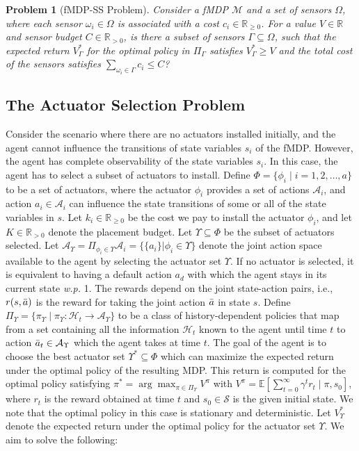 \documentclass[twocolumn]{autart}    %
\newtheorem{problem}{Problem}
\begin{document}
\begin{problem}[fMDP-SS Problem]
\label{prob:momdpss}
Consider a fMDP $\mathcal{M}$ and a set of sensors $\Omega$, where each sensor $\omega_i \in \Omega$ is associated with a cost $c_i \in \mathbb{R}_{\geq 0}$. For a value $V \in \mathbb{R}$ and sensor budget $C \in \mathbb{R}_{> 0}$, is there a subset of sensors $\Gamma \subseteq \Omega$, such that the expected return $V_\Gamma^*$ for the optimal policy in $ \Pi_\Gamma$ satisfies  $V_\Gamma^* \geq V$ and the total cost of the sensors satisfies $\sum_{\omega_i \in \Gamma} c_i \leq C$?
\end{problem}

\subsection{The Actuator Selection Problem}
Consider the scenario where there are no actuators installed initially, and the agent cannot influence the transitions of state variables $s_i$ of the fMDP. However, the agent has complete observability of the state variables $s_i$. In this case, the agent has to select a subset of actuators to install. 
Define $\Phi = \{\phi_i \mid i = 1,2,\hdots,a\}$ to be a set of actuators, where the actuator $\phi_i$ provides a set of actions $\mathcal{A}_i$, and action $a_i \in \mathcal{A}_i$ can influence the state transitions of some or all of the state variables in $s$. Let $k_i \in \mathbb{R}_{\geq 0}$ be the cost we pay to install the actuator $\phi_i$, and let $K \in \mathbb{R}_{> 0}$ denote the placement budget. Let $\Upsilon \subseteq \Phi$ be the subset of actuators selected. Let $\mathcal{A}_{\Upsilon} = \Pi_{\phi_i \in \Upsilon} \mathcal{A}_i = \{ \{{a}_i\}| \phi_i \in \Upsilon \} $ denote the joint action space available to the agent by selecting the actuator set $\Upsilon$. If no actuator is selected, it is equivalent to having a default action $a_{d}$ with which the agent stays in its current state \textit{w.p.} 1. The rewards depend on the joint state-action pairs, i.e., $r(s,\Bar{a})$ is the reward for taking the joint action $\Bar{a}$ in state $s$. Define $\Pi_\Upsilon = \{ \pi_\Upsilon \mid \pi_\Upsilon : \mathcal{H}_t \rightarrow \mathcal{A}_\Upsilon\}$ to be a class of history-dependent  policies that map from a set containing all the information $\mathcal{H}_t$ known to the agent until time $t$  to action $\Bar{a}_t \in \mathcal{A}_\Upsilon$ which the agent takes at time $t$. The goal of the agent is to choose the best actuator set $\Upsilon^* \subseteq \Phi$ which can maximize the expected  return under the optimal policy of the resulting MDP. {This  return is computed for the optimal policy satisfying  $\pi^*=\arg \max_{\pi \in \Pi_\Upsilon} V^\pi$ with $V^\pi=\mathbb{E}\left[\sum_{t=0}^{\infty}\gamma^t r_t \mid \pi, s_0 \right]$,
where $r_t$ is the reward obtained at time $t$ and $s_0 \in \mathcal{S}$ is the given initial state.} We note that the optimal policy in this case is stationary and deterministic.  Let $V_{\Upsilon}^*$ denote the expected return under the optimal policy for the actuator set $\Upsilon$. We aim to solve the following: 
\end{document}
